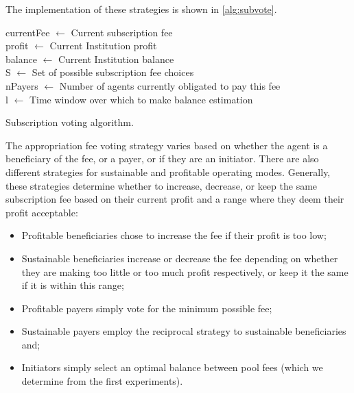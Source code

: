 The implementation of these strategies is shown in \autoref{alg:subvote}.

\begin{algorithm}

	currentFee $\leftarrow$ Current subscription fee \\
	profit $\leftarrow$ Current Institution profit \\
	balance $\leftarrow$ Current Institution balance \\
	S $\leftarrow$ Set of possible subscription fee choices \\
	nPayers $\leftarrow$ Number of agents currently obligated to pay this fee \\
	l $\leftarrow$ Time window over which to make balance estimation \\
	\BlankLine
	\caption{Subscription voting algorithm.}\label{alg:subvote}
\end{algorithm}

The appropriation fee voting strategy varies based on whether the agent is a
beneficiary of the fee, or a payer, or if they are an initiator. There are
also different strategies for sustainable and profitable operating modes.
Generally, these strategies determine whether to increase, decrease, or keep
the same subscription fee based on their current profit and a range where they
deem their profit acceptable:

\begin{itemize}
\item Profitable beneficiaries chose to increase the fee if their profit is too low;
\item Sustainable beneficiaries increase or decrease the fee depending on whether they are making too little or too much profit respectively, or keep it the same if it is within this range;
\item Profitable payers simply vote for the minimum possible fee;
\item Sustainable payers employ the reciprocal strategy to sustainable beneficiaries and;
\item Initiators simply select an optimal balance between pool fees (which we determine from the first experiments).
\end{itemize}

